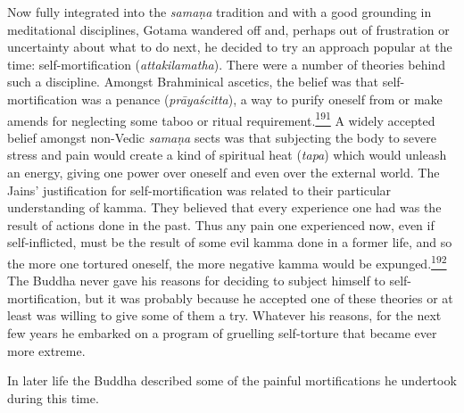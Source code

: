 Now fully integrated into the \emph{samaṇa} tradition and with a good
grounding in meditational disciplines, Gotama wandered off and, perhaps
out of frustration or uncertainty about what to do next, he decided to
try an approach popular at the time: self-mortification
(\emph{attakilamatha}). There were a number of theories behind such a
discipline. Amongst Brahminical ascetics, the belief was that
self-mortification was a penance (\emph{prāyaścitta}), a way to purify
oneself from or make amends for neglecting some taboo or ritual
requirement.\label{footprints_split_009.html_fnref191}\hyperref[footprints_split_024.htmlux5cux23fn191]{\textsuperscript{191}}
A widely accepted belief amongst non-Vedic \emph{samaṇa} sects was that
subjecting the body to severe stress and pain would create a kind of
spiritual heat (\emph{tapa}) which would unleash an energy, giving one
power over oneself and even over the external world. The Jains'
justification for self-mortification was related to their particular
understanding of kamma. They believed that every experience one had was
the result of actions done in the past. Thus any pain one experienced
now, even if self-inflicted, must be the result of some evil kamma done
in a former life, and so the more one tortured oneself, the more
negative kamma would be
expunged.\label{footprints_split_009.html_fnref192}\hyperref[footprints_split_024.htmlux5cux23fn192]{\textsuperscript{192}}
The Buddha never gave his reasons for deciding to subject himself to
self-mortification, but it was probably because he accepted one of these
theories or at least was willing to give some of them a try. Whatever
his reasons, for the next few years he embarked on a program of
gruelling self-torture that became ever more extreme.

In later life the Buddha described some of the painful mortifications he
undertook during this time.

